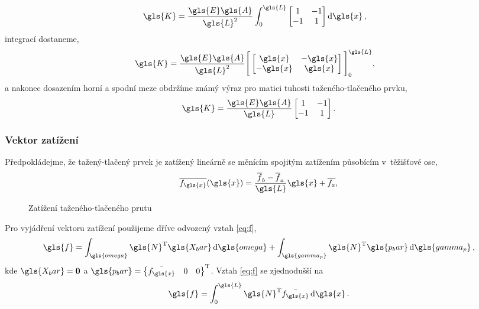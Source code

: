 \begin{align*}
    \gls{K} &= \frac{\gls{E}\gls{A}}{\gls{L}^2}\int_{0}^{\gls{L}}
    \begin{bmatrix}
    1 & -1 \\
    -1 & 1    
    \end{bmatrix}
    \dd{\gls{x}},
\end{align*}
integrací dostaneme,
\begin{align*}
    \gls{K} &= \frac{\gls{E}\gls{A}}{\gls{L}^2}
    \Bigg[
    \begin{bmatrix}
    \gls{x} & -\gls{x} \\
    -\gls{x} & \gls{x}    
    \end{bmatrix}
    \Bigg]_{0}^{\gls{L}},
\end{align*}
a nakonec dosazením horní a spodní meze obdržíme známý výraz pro matici tuhosti taženého-tlačeného prvku,
\begin{equation}
    \gls{K} = \frac{\gls{E}\gls{A}}{\gls{L}}
    \begin{bmatrix}
        1 & -1 \\
        -1 & 1
    \end{bmatrix}.
\end{equation}

\subsubsection*{Vektor zatížení}

Předpokládejme, že tažený-tlačený prvek je zatížený lineárně se měnícím spojitým zatížením působícím v~těžišťové ose,
\begin{equation}
    \overline{f_{\gls{x}}}(\gls{x}) = \frac{\overline{f}_b - \overline{f}_a}{\gls{L}} \gls{x} + \overline{f_a},
\end{equation}
\begin{figure}[H]
    
    \caption{Zatížení taženého-tlačeného prutu}
    \label{fig:bar_load}
\end{figure}

Pro vyjádření vektoru zatížení použijeme dříve odvozený vztah \ref{eq:f},
\begin{equation*}
    \gls{f} = \int_{\gls{omega}} \gls{N}^{\mathrm{T}} \gls{X_bar} \dd{\gls{omega}} + \int_{\gls{gamma_p}} \gls{N}^{\mathrm{T}} \gls{p_bar} \dd{\gls{gamma_p}},
\end{equation*}
kde $\gls{X_bar} = \matr{0}$ a $\gls{p_bar} = \begin{Bmatrix}\bar{f_{\gls{x}}} & 0 & 0\end{Bmatrix}^{\mathrm{T}}$.
Vztah \ref{eq:f} se zjednodušší na
\begin{equation}
    \gls{f} = \int_{0}^{\gls{L}} \gls{N}^{\mathrm{T}} \bar{f_{\gls{x}}} \dd{\gls{x}}.
\end{equation}

